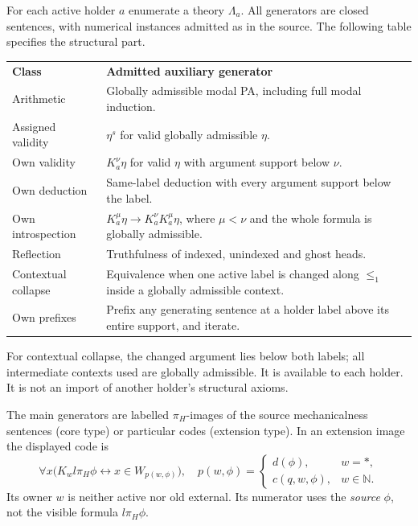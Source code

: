 \documentclass[11pt]{article}
\newcommand{\N}{\mathbb N}
\begin{document}
For each active holder $a$ enumerate a theory $\Lambda_a$. All
generators are closed sentences, with numerical instances admitted as
in the source. The following table specifies the structural part.
\begin{center}
\renewcommand{\arraystretch}{1.3}
\begin{tabular}{@{}p{.23\linewidth}p{.72\linewidth}@{}}
\textbf{Class}&\textbf{Admitted auxiliary generator}\\[3pt]
Arithmetic&Globally admissible modal PA, including full modal induction.\\
Assigned validity&$\eta^s$ for valid globally admissible $\eta$.\\
Own validity&$K_a^\nu\eta$ for valid $\eta$ with argument support below $\nu$.\\
Own deduction&Same-label deduction with every argument support below the label.\\
Own introspection&$K_a^\mu\eta\to K_a^\nu K_a^\mu\eta$, where $\mu<\nu$ and the whole formula is globally admissible.\\
Reflection&Truthfulness of indexed, unindexed and ghost heads.\\
Contextual collapse&Equivalence when one active label is changed along $\le_1$ inside a globally admissible context.\\
Own prefixes&Prefix any generating sentence at a holder label above its entire support, and iterate.\\
\end{tabular}
\end{center}
For contextual collapse, the changed argument lies below both labels;
all intermediate contexts used are globally admissible. It is available
to each holder. It is not an import of another holder's structural
axioms.

The main generators are labelled $\pi_H$-images of the source
mechanicalness sentences (core type) or particular codes (extension
type). In an extension image the displayed code is
\begin{equation}\label{eq:recorded-code}
 \forall x\bigl(K_w l\pi_H\phi
           \leftrightarrow x\in W_{p(w,\phi)}\bigr),
 \quad
 p(w,\phi)=
 \begin{cases}d(\phi),&w=*,\\c(q,w,\phi),&w\in\N.\end{cases}
\end{equation}
Its owner $w$ is neither active nor old external. Its numerator uses
the \emph{source} $\phi$, not the visible formula $l\pi_H\phi$.
\end{document}
